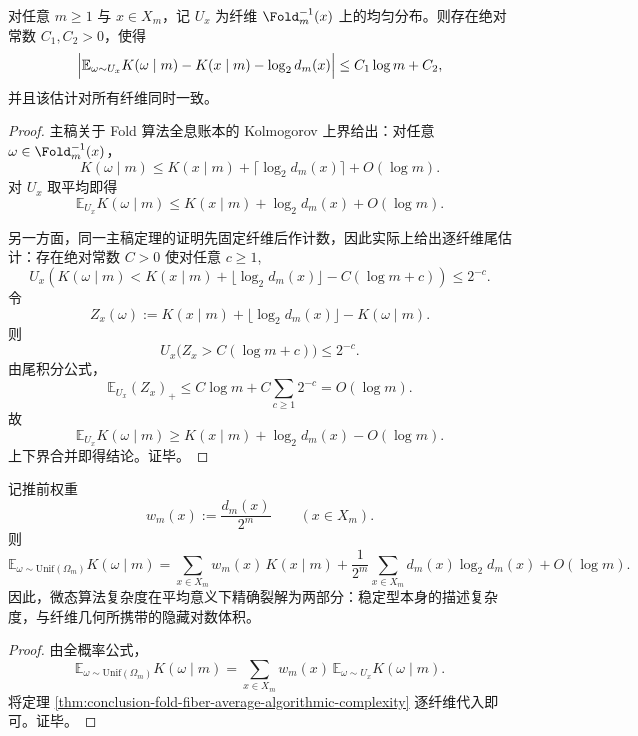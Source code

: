\begin{theorem}[纤维内算法复杂度的平均精确律]\label{thm:conclusion-fold-fiber-average-algorithmic-complexity}
对任意 \(m\ge1\) 与 \(x\in X_m\)，记 \(U_x\) 为纤维 \(\Fold_m^{-1}(x)\) 上的均匀分布。则存在绝对常数 \(C_1,C_2>0\)，使得
\[
\Bigl|
\mathbb E_{\omega\sim U_x}K(\omega\mid m)
-
K(x\mid m)-\log_2 d_m(x)
\Bigr|
\le C_1\log m + C_2,
\]
并且该估计对所有纤维同时一致。
\end{theorem}
\begin{proof}
主稿关于 Fold 算法全息账本的 Kolmogorov 上界给出：对任意 \(\omega\in \Fold_m^{-1}(x)\)，
\[
K(\omega\mid m)\le K(x\mid m)+\lceil \log_2 d_m(x)\rceil + O(\log m).
\]
对 \(U_x\) 取平均即得
\[
\mathbb E_{U_x}K(\omega\mid m)\le K(x\mid m)+\log_2 d_m(x)+O(\log m).
\]

另一方面，同一主稿定理的证明先固定纤维后作计数，因此实际上给出逐纤维尾估计：存在绝对常数 \(C>0\) 使对任意 \(c\ge1\),
\[
U_x\!\left(
K(\omega\mid m)
<
K(x\mid m)+\lfloor \log_2 d_m(x)\rfloor - C(\log m+c)
\right)\le 2^{-c}.
\]
令
\[
Z_x(\omega):=
K(x\mid m)+\lfloor \log_2 d_m(x)\rfloor-K(\omega\mid m).
\]
则
\[
U_x\bigl(Z_x>C(\log m+c)\bigr)\le 2^{-c}.
\]
由尾积分公式，
\[
\mathbb E_{U_x}(Z_x)_+
\le
C\log m + C\sum_{c\ge1}2^{-c}
=
O(\log m).
\]
故
\[
\mathbb E_{U_x}K(\omega\mid m)
\ge
K(x\mid m)+\log_2 d_m(x)-O(\log m).
\]
上下界合并即得结论。证毕。
\end{proof}

\begin{corollary}\label{cor:conclusion-global-algorithmic-complexity-pushforward-fiber}
记推前权重
\[
w_m(x):=\frac{d_m(x)}{2^m}\qquad (x\in X_m).
\]
则
\[
\mathbb E_{\omega\sim \mathrm{Unif}(\Omega_m)}K(\omega\mid m)
=
\sum_{x\in X_m} w_m(x)\,K(x\mid m)
+
\frac1{2^m}\sum_{x\in X_m} d_m(x)\log_2 d_m(x)
+
O(\log m).
\]
因此，微态算法复杂度在平均意义下精确裂解为两部分：稳定型本身的描述复杂度，与纤维几何所携带的隐藏对数体积。
\end{corollary}
\begin{proof}
由全概率公式，
\[
\mathbb E_{\omega\sim \mathrm{Unif}(\Omega_m)}K(\omega\mid m)
=
\sum_{x\in X_m} w_m(x)\,
\mathbb E_{\omega\sim U_x}K(\omega\mid m).
\]
将定理 \ref{thm:conclusion-fold-fiber-average-algorithmic-complexity} 逐纤维代入即可。证毕。
\end{proof}

